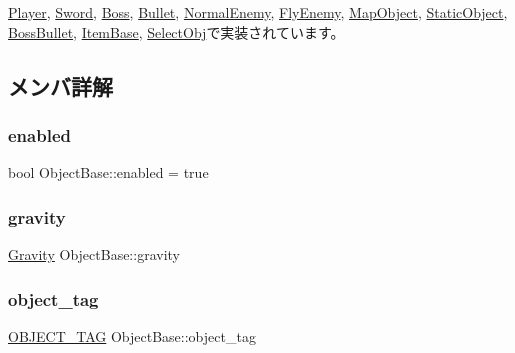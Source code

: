 \mbox{\hyperlink{class_player_ab8accc9b83b030f5313f1b4872a7e634}{Player}}, \mbox{\hyperlink{class_sword_a3e0221aa5c05ecada9def39fb38c0059}{Sword}}, \mbox{\hyperlink{class_boss_a12b3970fee863198d6dafb9bafc55d47}{Boss}}, \mbox{\hyperlink{class_bullet_aa0867038c9c35e30ee09e21ecdccf281}{Bullet}}, \mbox{\hyperlink{class_normal_enemy_a9f66e4bf18310ec7c5dc679bea78fa8e}{Normal\+Enemy}}, \mbox{\hyperlink{class_fly_enemy_a5122c8fea26ebbd0390acfd6e41931ff}{Fly\+Enemy}}, \mbox{\hyperlink{class_map_object_ab6b8849f15175417eca94b2703945e4b}{Map\+Object}}, \mbox{\hyperlink{class_static_object_a7fa678c3c4032bb6e9417f93a8bb895c}{Static\+Object}}, \mbox{\hyperlink{class_boss_bullet_a8e9923194c03eb0d4225ed8dae409f29}{Boss\+Bullet}}, \mbox{\hyperlink{class_item_base_a8edff8edcf884f9590f973fd05d218bc}{Item\+Base}}, \mbox{\hyperlink{class_select_obj_a4788d957629f0b69dc78166f09f949bb}{Select\+Obj}}で実装されています。



\subsection{メンバ詳解}
\mbox{\label{class_object_base_ade1c868f20653a6fa5236544120eca2b}} 
\subsubsection{\texorpdfstring{enabled}{enabled}}
{\footnotesize\ttfamily bool Object\+Base\+::enabled = true}

\mbox{\label{class_object_base_a570bfa03730e906989187bfbcad95c51}} 
\subsubsection{\texorpdfstring{gravity}{gravity}}
{\footnotesize\ttfamily \mbox{\hyperlink{class_gravity}{Gravity}} Object\+Base\+::gravity}

\mbox{\label{class_object_base_aff7eb5482ca9bc1cd30b84994d0dad8b}} 
\subsubsection{\texorpdfstring{object\+\_\+tag}{object\_tag}}
{\footnotesize\ttfamily \mbox{\hyperlink{object__base_8h_a0eff9883ab049ee02773dde19d057c0c}{O\+B\+J\+E\+C\+T\+\_\+\+T\+AG}} Object\+Base\+::object\+\_\+tag}

